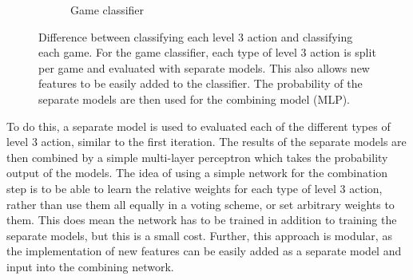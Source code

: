 \documentclass[Report.tex]{subfiles}
\begin{document}
\begin{figure}[H]
\begin{subfigure}{1\textwidth}
\caption{Game classifier}
\end{subfigure}
\caption{Difference between classifying each level 3 action and classifying each game. For the game classifier, each type of level 3 action is split per game and evaluated with separate models. This also allows new features to be easily added to the classifier. The probability of the separate models are then used for the combining model (MLP).}
\end{figure}

To do this, a separate model is used to evaluated each of the different types of level 3 action, similar to the first iteration. The results of the separate models are then combined by a simple multi-layer perceptron which takes the probability output of the models. The idea of using a simple network for the combination step is to be able to learn the relative weights for each type of level 3 action, rather than use them all equally in a voting scheme, or set arbitrary weights to them. This does mean the network has to be trained in addition to training the separate models, but this is a small cost. Further, this approach is modular, as the implementation of new features can be easily added as a separate model and input into the combining network.
\end{document}
